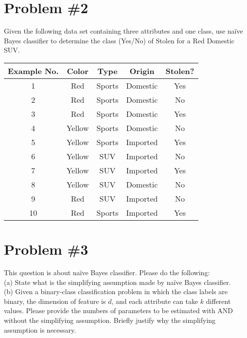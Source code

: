 \documentclass[12pt]{article}
\begin{document}
	\section*{Problem \#2}
	Given the following data set containing three attributes and one class, use na\"ive Bayes classifier to determine the class (Yes/No) of Stolen for a Red Domestic SUV.
	\begin{center}
		\begin{tabular*}{280pt}[t]{c |c c c | c}
			Example No. & Color & Type & Origin & Stolen? \\
			\hline \hline
			1 & Red & Sports & Domestic & Yes \\
			2 & Red & Sports & Domestic & No \\
			3 & Red & Sports & Domestic & Yes \\
			4 & Yellow & Sports & Domestic & No \\
			5 & Yellow & Sports & Imported & Yes \\
			6 & Yellow & SUV & Imported & No \\
			7 & Yellow & SUV & Imported & Yes \\
			8 & Yellow & SUV & Domestic & No \\
			9 & Red & SUV & Imported & No \\
			10 & Red & Sports & Imported & Yes \\
		\end{tabular*}
	\end{center}

	
	\section*{Problem \#3}
	This question is about na\"ive Bayes classifier. Please do the following: \\
	(a) State what is the simplifying assumption made by na\"ive Bayes classifier. \\
	(b) Given a binary-class  classification  problem  in  which the  class  labels  are  binary,  the  dimension  of feature is $d$, and each attribute can take $k$ different values. Please provide the numbers of parameters to  be  estimated  with  AND  without  the  simplifying  assumption. Briefly  justify  why the  simplifying assumption is necessary. \\
	
	
\end{document}
